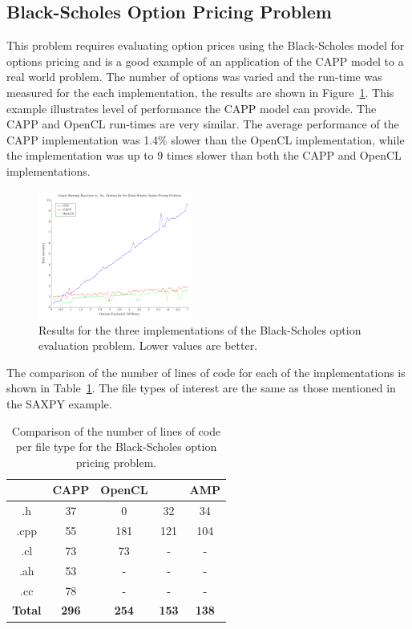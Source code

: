 \documentclass{sig-alternate-05-2015}
\begin{document}
\subsection{Black-Scholes Option Pricing Problem}

This problem requires evaluating option prices using the Black-Scholes 
model for options pricing and is a good example of an application of the CAPP 
model to a real world problem. The number of options was varied and the
run-time was measured for the each implementation, the results are shown in 
Figure~\ref{fig:blackscholes}. 
This example illustrates level of performance the CAPP model can
provide. The CAPP and OpenCL run-times are very similar. The average 
performance of the CAPP implementation was 1.4\% slower than the
OpenCL implementation, while the \CPP implementation was up to 9 times slower
than both the CAPP and OpenCL implementations.

\begin{figure}[!t]
	\centering
	\includegraphics[width=0.45\textwidth]{BlackScholes}
	\caption{Results for the three implementations of the Black-Scholes option
		evaluation problem. Lower values are better.}
	\label{fig:blackscholes}
\end{figure}

The comparison of the number of lines of code for each of the implementations is
shown in Table~\ref{tab:blackscholes}. The file types of interest are the same as 
those mentioned in the SAXPY example. 

\begin{table}[!b]
\centering
\caption{Comparison of the number of lines of code per file type for the
Black-Scholes option pricing problem.}
\label{tab:blackscholes}
\begin{tabular}{|c|c|c|c|c|} 
	\hline
                    & CAPP			& OpenCL		& \CPP		& \CPP AMP          \\ \hline
    .h				& 37			& 0				& 32		& 34                \\ \hline
    .cpp			& 55			& 181			& 121		& 104               \\ \hline
    .cl				& 73			& 73			& -			& -                 \\ \hline
    .ah				& 53			& -				& -			& -                 \\ \hline
    .cc				& 78			& -				& -			& -                 \\ \hline
    \textbf{Total}	& \textbf{296}	& \textbf{254}	& \textbf{153}	& \textbf{138}	\\ \hline		
\hline
\end{tabular}
\end{table}
\end{document}
